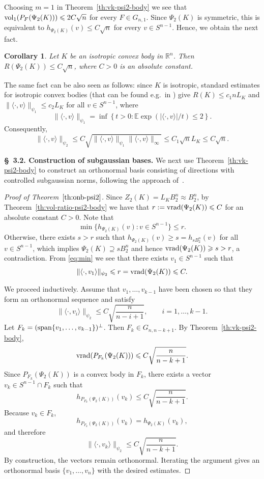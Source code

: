 \documentclass[11pt,leqno]{article}
\newtheorem{corollary}[theorem]{Corollary}
\theoremstyle{definition}
\numberwithin{equation}{section}
\newcommand{\ls}{\leqslant}
\newcommand{\gr}{\geqslant}
\begin{document}
Choosing $m=1$ in Theorem~\ref{th:vk-psi2-body} we see that ${\rm vol}_1(P_F(\Psi_2(K)))\ls 2C\sqrt{n}$ for every $F\in G_{n,1}$. Since
$\Psi_2(K)$ is symmetric, this is equivalent to $h_{\Psi_2(K)}(v)\ls C\sqrt{n}$ for every $v\in S^{n-1}$. Hence, we obtain the next fact.

\begin{corollary}\label{cor:radius}
Let $K$ be an isotropic convex body in $\mathbb{R}^n$. Then $R(\Psi_2(K))\ls C\sqrt{n}$, where $C>0$ is an absolute constant.
\end{corollary}

The same fact can be also seen as follows: since $K$ is isotropic, standard estimates for isotropic convex bodies (that can be found e.g.~in \cite[Chapter~3]{BGVV-book}) give
$R(K)\ls c_1 nL_K$ and $\|\langle\cdot,v\rangle\|_{\psi_1}\ls c_2L_K$ for all $v\in S^{n-1}$, where
\[\|\langle\cdot,v\rangle\|_{\psi_1}=\inf\left\{t>0:\mathbb E\exp\!\left(|\langle \cdot,v\rangle |/t\right)\ls 2\right\}.\]
Consequently,
\[\|\langle\cdot,v\rangle\|_{\psi_2}\ls C\sqrt{\|\langle\cdot,v\rangle\|_{\psi_1}\|\langle\cdot,v\rangle\|_\infty}
\ls C_1\sqrt{n}L_K \ls C\sqrt{n}.\]

\medskip 

\noindent \textbf{\S~3.2. Construction of subgaussian bases.}
We next use Theorem~\ref{th:vk-psi2-body} to construct an orthonormal basis
consisting of directions with controlled subgaussian norms, following the
approach of~\cite{Letwin-Mikulincer-2026}.

\begin{proof}[Proof of Theorem~$\ref{th:onb-psi2}$]
Since $Z_2(K)=L_KB_2^n\approx B_2^n$, by Theorem~\ref{th:vol-ratio-psi2-body} we have that 
$r:={\rm vrad}(\Psi_2(K))\ls C$ for an absolute constant $C>0$. Note that 
\begin{equation}\label{eq:min}\min\{h_{\Psi_2(K)}(v):v\in S^{n-1}\}\ls r.\end{equation} 
Otherwise, there exists $s>r$ such that
$h_{\Psi_2(K)}(v)\gr s=h_{sB_2^n}(v)$ for all $v\in S^{n-1}$, which implies $\Psi_2(K)\supseteq sB_2^n$ and hence
${\rm vrad}(\Psi_2(K))\gr s>r$, a contradiction. 
From \eqref{eq:min} we see that there exists $v_1\in S^{n-1}$ such that
\[\|\langle\cdot,v_1\rangle\|_{\psi_2}\ls r={\rm vrad}(\Psi_2(K))\ls C .\]

We proceed inductively. Assume that $v_1,\ldots,v_{k-1}$ have been chosen so that they form an orthonormal sequence and satisfy
\[\|\langle\cdot,v_i\rangle\|_{\psi_2}\ls C\sqrt{\frac{n}{n-i+1}},\qquad i=1,\ldots,k-1 .\]
Let $F_k=({\rm span}\{v_1,\ldots,v_{k-1}\})^\perp $. Then $F_k\in G_{n,n-k+1}$. By Theorem~\ref{th:vk-psi2-body},
\[{\rm vrad}(P_{F_k}(\Psi_2(K)))\ls C\sqrt{\frac{n}{n-k+1}} .\]
Since $P_{F_k}(\Psi_2(K))$ is a convex body in $F_k$, there exists a vector $v_k\in S^{n-1}\cap F_k$ such that
\[h_{P_{F_k}(\Psi_2(K))}(v_k)\ls C\sqrt{\frac{n}{n-k+1}} .\]
Because $v_k\in F_k$,
\[h_{P_{F_k}(\Psi_2(K))}(v_k)=h_{\Psi_2(K)}(v_k),\]
and therefore
\[\|\langle\cdot,v_k\rangle\|_{\psi_2}\ls C\sqrt{\frac{n}{n-k+1}} .\]
By construction, the vectors remain orthonormal. Iterating the argument gives an orthonormal basis
$\{v_1,\ldots,v_n\}$ with the desired estimates.
\end{proof}
\end{document}
